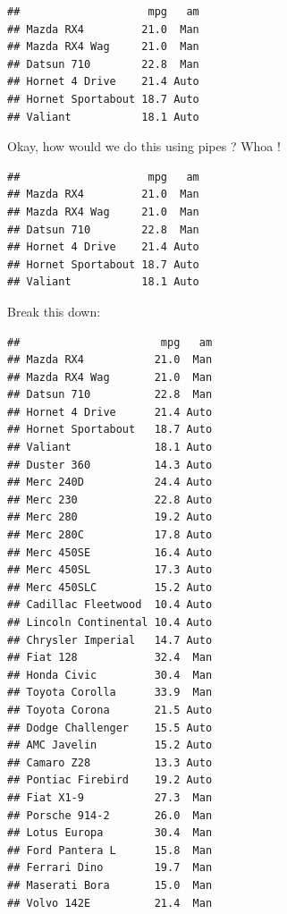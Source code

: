 \documentclass[]{book}
\newenvironment{Shaded}{\begin{snugshade}}{\end{snugshade}}
\newcommand{\KeywordTok}[1]{\textcolor[rgb]{0.13,0.29,0.53}{\textbf{#1}}}
\newcommand{\NormalTok}[1]{#1}
\newcommand{\OperatorTok}[1]{\textcolor[rgb]{0.81,0.36,0.00}{\textbf{#1}}}
\newcommand{\StringTok}[1]{\textcolor[rgb]{0.31,0.60,0.02}{#1}}
\begin{document}
\begin{verbatim}
##                    mpg   am
## Mazda RX4         21.0  Man
## Mazda RX4 Wag     21.0  Man
## Datsun 710        22.8  Man
## Hornet 4 Drive    21.4 Auto
## Hornet Sportabout 18.7 Auto
## Valiant           18.1 Auto
\end{verbatim}

Okay, how would we do this using pipes ? Whoa !

\begin{Shaded}
\end{Shaded}

\begin{verbatim}
##                    mpg   am
## Mazda RX4         21.0  Man
## Mazda RX4 Wag     21.0  Man
## Datsun 710        22.8  Man
## Hornet 4 Drive    21.4 Auto
## Hornet Sportabout 18.7 Auto
## Valiant           18.1 Auto
\end{verbatim}

Break this down:

\begin{Shaded}
\end{Shaded}

\begin{verbatim}
##                      mpg   am
## Mazda RX4           21.0  Man
## Mazda RX4 Wag       21.0  Man
## Datsun 710          22.8  Man
## Hornet 4 Drive      21.4 Auto
## Hornet Sportabout   18.7 Auto
## Valiant             18.1 Auto
## Duster 360          14.3 Auto
## Merc 240D           24.4 Auto
## Merc 230            22.8 Auto
## Merc 280            19.2 Auto
## Merc 280C           17.8 Auto
## Merc 450SE          16.4 Auto
## Merc 450SL          17.3 Auto
## Merc 450SLC         15.2 Auto
## Cadillac Fleetwood  10.4 Auto
## Lincoln Continental 10.4 Auto
## Chrysler Imperial   14.7 Auto
## Fiat 128            32.4  Man
## Honda Civic         30.4  Man
## Toyota Corolla      33.9  Man
## Toyota Corona       21.5 Auto
## Dodge Challenger    15.5 Auto
## AMC Javelin         15.2 Auto
## Camaro Z28          13.3 Auto
## Pontiac Firebird    19.2 Auto
## Fiat X1-9           27.3  Man
## Porsche 914-2       26.0  Man
## Lotus Europa        30.4  Man
## Ford Pantera L      15.8  Man
## Ferrari Dino        19.7  Man
## Maserati Bora       15.0  Man
## Volvo 142E          21.4  Man
\end{verbatim}
\end{document}
